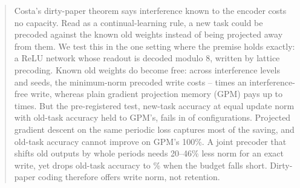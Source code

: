 \begin{abstract}
Costa's dirty-paper theorem says interference known to the encoder costs no capacity.
Read as a continual-learning rule, a new task could be precoded against the known old weights instead of being projected away from them.
We test this in the one setting where the premise holds exactly: a ReLU network whose readout is decoded modulo 8, written by lattice precoding.
Known old weights do become free: across \nconfigs{} interference levels and \nseeds{} seeds, the minimum-norm precoded write costs \cleanmin--\cleanmax{} times an interference-free write, whereas plain gradient projection memory (GPM) pays up to \gpmcleanmax{} times.
But the pre-registered test, new-task accuracy at equal update norm with old-task accuracy held to GPM's, fails in \nkilled{} of \nconfigs{} configurations.
Projected gradient descent on the same periodic loss captures most of the saving, and old-task accuracy cannot improve on GPM's 100\%.
A joint precoder that shifts old outputs by whole periods needs 20--46\% less norm for an exact write, yet drops old-task accuracy to \jointAmin\% when the budget falls short.
Dirty-paper coding therefore offers write norm, not retention.
\end{abstract}
